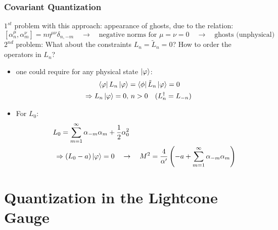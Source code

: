 \documentclass[aspectratio=169]{beamer}
\begin{document}
	\begin{frame}
		\frametitle{Covariant Quantization}
		$1^{st}$ problem with this approach: appearance of ghosts, due to the relation:
		\begin{equation*}
			\left[\alpha^\mu_n, \alpha^\nu_m\right] = n \eta^{\mu\nu} \delta_{n,-m} \quad \rightarrow \quad \text{negative norms for } \mu=\nu=0 \quad \rightarrow \quad \text{ghosts (unphysical)}
		\end{equation*}
		$2^{nd}$ problem: What about the constraints $L_n = \tilde{L}_n = 0$? How to order the operators in $L_n$?
		\begin{itemize}
			\item one could require for any physical state $\ket{\varphi}$:
			\begin{align*}
				&\qquad \bra{\varphi}L_n\ket{\varphi} = \bra{\phi}\tilde{L}_n\ket{\varphi} = 0 \\
				& \Rightarrow L_n\ket{\varphi} = 0, \, n>0 \quad (L^\dagger_n = L_{-n}) \\
			\end{align*}
			\item For $L_0$:
			\begin{align*}
				 \qquad L_0 = \sum_{m=1}^{\infty} \alpha_{-m} \alpha_m + \frac{1}{2} &\alpha^2_0 \\
				 \Rightarrow (L_0 - a)\ket{\varphi} = 0 \quad & \rightarrow \quad  M^2 = \frac{4}{\alpha'} \left(-a+\sum_{m=1}^{\infty}\alpha_{-m}\alpha_m\right) \\
			\end{align*}
		\end{itemize}
	\end{frame}

	\section{Quantization in the Lightcone Gauge}
	
\end{document}
